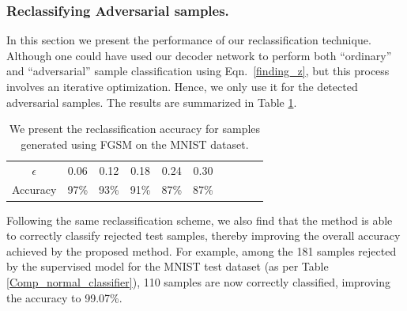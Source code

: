 \documentclass[letterpaper]{article} %
\begin{document}
\subsubsection{Reclassifying Adversarial samples.}
In this section we present the performance of our reclassification technique. Although one could have used our decoder network to perform both ``ordinary'' and ``adversarial'' sample classification using Eqn.~\ref{finding_z}, but this process involves an iterative optimization. Hence, we only use it for the detected adversarial samples. The results are summarized in Table \ref{reclassification_acc}.
\begin{table}[H]
\centering
\begin{tabular}{c c c c c c c c c c}
\hline
$\epsilon$ & 0.06 & 0.12 & 0.18 & 0.24 & 0.30 \\
Accuracy & 97\% & 93\% & 91\% & 87\% & 87\% \\
\hline
\end{tabular}
\caption{We present the reclassification accuracy for samples generated using FGSM on the MNIST dataset.}
\label{reclassification_acc}
\end{table}
Following the same reclassification scheme, we also find that the method is able to correctly classify rejected test samples, thereby improving the overall accuracy achieved by the proposed method. For example, among the 181 samples rejected by the supervised model for the MNIST test dataset (as per Table \ref{Comp_normal_classifier}), 110 samples are now correctly classified, improving the accuracy to 99.07\%.
\end{document}
